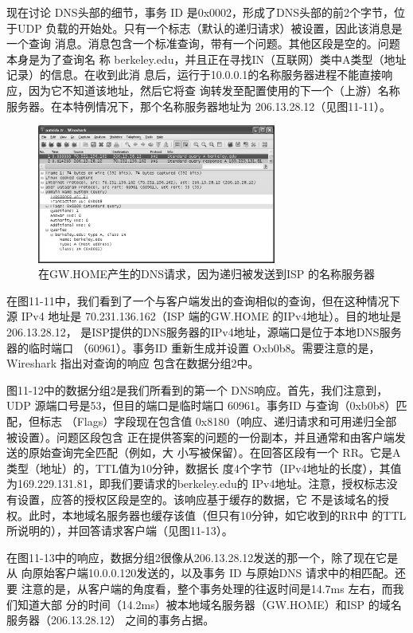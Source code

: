 现在讨论 DNS头部的细节，事务 ID 是0x0002，形成了DNS头部的前2个字节，位
于UDP 负载的开始处。只有一个标志（默认的递归请求）被设置，因此该消息是一个查询
消息。消息包含一个标准查询，带有一个问题。其他区段是空的。问题本身是为了查询名
称 berkeley.edu，并且正在寻找IN（互联网）类中A类型（地址记录）的信息。在收到此消
息后，运行于10.0.0.1的名称服务器进程不能直接响应，因为它不知道该地址，然后它将查
询转发至配置使用的下一个（上游）名称服务器。在本特例情况下，那个名称服务器地址为
206.13.28.12（见图11-11）。

\begin{figure}[!htb]
  \centering
  \includegraphics[width=0.7\textwidth]{imgs/11/11-11.png}
  \caption{在GW.HOME产生的DNS请求，因为递归被发送到ISP 的名称服务器}
\end{figure}

在图11-11中，我们看到了一个与客户端发出的查询相似的查询，但在这种情况下源
IPv4 地址是 70.231.136.162（ISP 端的GW.HOME 的IPv4地址）。目的地址是206.13.28.12，
是ISP提供的DNS服务器的IPv4地址，源端口是位于本地DNS服务器的临时端口
（60961）。事务ID 重新生成并设置 Oxb0b8。需要注意的是，Wireshark 指出对查询的响应
包含在数据分组2中。

图11-12中的数据分组2是我们所看到的第一个 DNS响应。首先，我们注意到，UDP
源端口号是53，但目的端口是临时端口 60961。事务ID 与查询（0xb0b8）匹配，但标志
（Flags）字段现在包含值 0x8180（响应、递归请求和可用递归全部被设置）。问题区段包含
正在提供答案的问题的一份副本，并且通常和由客户端发送的原始查询完全匹配（例如，大
小写被保留）。在回答区段有一个 RR。它是A类型（地址）的，TTL值为10分钟，数据长
度4个字节（IPv4地址的长度），其值为169.229.131.81，即我们要请求的berkeley.edu的
IPv4地址。注意，授权标志没有设置，应答的授权区段是空的。该响应基于缓存的数据，它
不是该域名的授权。此时，本地域名服务器也缓存该值（但只有10分钟，如它收到的RR中
的TTL 所说明的），并回答请求客户端（见图11-13）。

在图11-13中的响应，数据分组2很像从206.13.28.12发送的那一个，除了现在它是从
向原始客户端10.0.0.120发送的，以及事务 ID 与原始DNS 请求中的相匹配。还要
注意的是，从客户端的角度看，整个事务处理的往返时间是14.7ms 左右，而我们知道大部
分的时间（14.2ms）被本地域名服务器（GW.HOME）和ISP 的域名服务器（206.13.28.12）
之间的事务占据。

